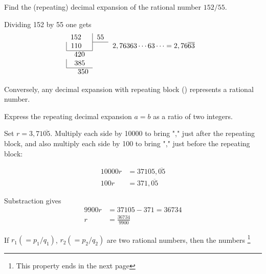 \documentclass[11pt]{amsbook}
\begin{document}
    	

\begin{exmp}
	Find the (repeating) decimal expansion of the rational number $152/55$.
	\par
	Dividing 152 by 55 one gets
\[
	\begin{tabular}{l|ll}
		152 									 & 55 &  \\ \cline{2-2}
		\multicolumn{1}{|l|}{110} 					 &	& $2,76363\cdots 63\cdots =2,76\overline{63}$ \\ \cline{1-1}
		\multicolumn{1}{l}{\phantom{0}420} 			 &	&\\
		\multicolumn{1}{|l}{\phantom{0}385} 		 &	&\\ \cline{1-1}
		\multicolumn{1}{l}{\phantom{0}\phantom{0}350} &	&
	\end{tabular}
\]
\end{exmp}

\par
Conversely, any decimal expansion with repeating block () represents a rational number.
\par

\begin{exmp}Express the repeating decimal expansion $a = b$ as a ratio of two integers.
	\begin{hSolution}
		Set
		$r = 3,71\overline{05}$.
		Multiply each side by 10000 to bring "," just after the repeating block, and also multiply each side by 100 to bring "," just before the repeating block:
	
		\begin{align*}
			10000 r & = 37105,\overline{05}\\
			100 r & =  371,\overline{05}
		\end{align*}
		
		\par \noindent
		Substraction gives
		\begin{align*}
			9900 r &= 37105 - 371 = 36734\\
			r &= \frac{36734}{9900}
		\end{align*}
	\end{hSolution}
\end{exmp}

\begin{hProperty}	
 	If $r_{1}(=p_{1}/q_{1})$,  $r_{2}(=p_{2}/q_{2})$ are two rational numbers, then the numbers \footnote{This property ends in the next page}
\end{hProperty}
\end{document}
